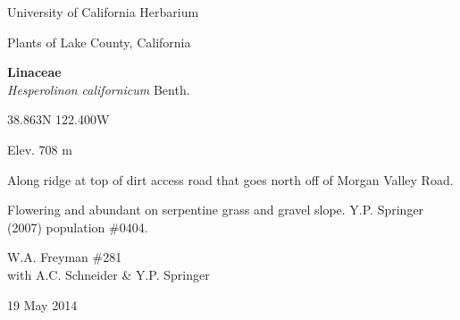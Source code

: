 \documentclass[letterpaper,10pt]{article}
\begin{document}
\begin{minipage}[t]{0.40\textwidth}

\begin{center}
University of California Herbarium \\
\begin{large}
Plants of Lake County, California \\
\end{large}
\vspace{\baselineskip}
\textbf{Linaceae} \\
\textit{Hesperolinon californicum} Benth.\\
\end{center}

\begin{footnotesize}

\begin{multicols}{2}
38.863\textdegree N 122.400\textdegree W
\columnbreak
\begin{flushright}
Elev. 708 m
\end{flushright}
\end{multicols}

Along ridge at top of dirt access road that goes north off of Morgan Valley Road.
\vspace{\baselineskip}

Flowering and abundant on serpentine grass and gravel slope. Y.P. Springer (2007) population \#0404.

\begin{multicols}{2}
W.A. Freyman \#281 \\
with A.C. Schneider \& Y.P. Springer
\columnbreak
\begin{flushright}
19 May 2014
\end{flushright}
\end{multicols}

\end{footnotesize}

\end{minipage}
%
\hspace{2cm}
%
\end{document}
